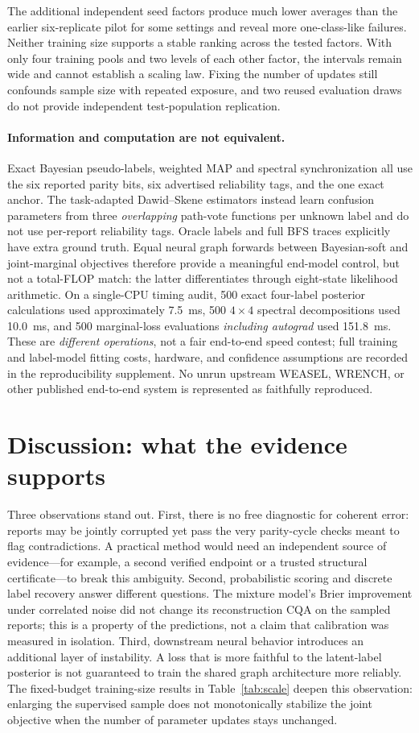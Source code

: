 \documentclass[10pt]{article}
\begin{document}
The additional independent seed factors produce much lower averages than the earlier six-replicate pilot for some settings and reveal more one-class-like failures. Neither training size supports a stable ranking across the tested factors. With only four training pools and two levels of each other factor, the intervals remain wide and cannot establish a scaling law. Fixing the number of updates still confounds sample size with repeated exposure, and two reused evaluation draws do not provide independent test-population replication.

\paragraph{Information and computation are not equivalent.}
Exact Bayesian pseudo-labels, weighted MAP and spectral synchronization all use the six reported parity bits, six advertised reliability tags, and the one exact anchor. The task-adapted Dawid--Skene estimators instead learn confusion parameters from three \emph{overlapping} path-vote functions per unknown label and do not use per-report reliability tags. Oracle labels and full BFS traces explicitly have extra ground truth. Equal neural graph forwards between Bayesian-soft and joint-marginal objectives therefore provide a meaningful end-model control, but not a total-FLOP match: the latter differentiates through eight-state likelihood arithmetic. On a single-CPU timing audit, 500 exact four-label posterior calculations used approximately 7.5~ms, 500 $4\times4$ spectral decompositions used 10.0~ms, and 500 marginal-loss evaluations \emph{including autograd} used 151.8~ms. These are \emph{different operations}, not a fair end-to-end speed contest; full training and label-model fitting costs, hardware, and confidence assumptions are recorded in the reproducibility supplement. No unrun upstream WEASEL, WRENCH, or other published end-to-end system is represented as faithfully reproduced.

\section{Discussion: what the evidence supports}
Three observations stand out. First, there is no free diagnostic for coherent error: reports may be jointly corrupted yet pass the very parity-cycle checks meant to flag contradictions. A practical method would need an independent source of evidence---for example, a second verified endpoint or a trusted structural certificate---to break this ambiguity. Second, probabilistic scoring and discrete label recovery answer different questions. The mixture model's Brier improvement under correlated noise did not change its reconstruction CQA on the sampled reports; this is a property of the predictions, not a claim that calibration was measured in isolation. Third, downstream neural behavior introduces an additional layer of instability. A loss that is more faithful to the latent-label posterior is not guaranteed to train the shared graph architecture more reliably. The fixed-budget training-size results in Table~\ref{tab:scale} deepen this observation: enlarging the supervised sample does not monotonically stabilize the joint objective when the number of parameter updates stays unchanged.
\end{document}
